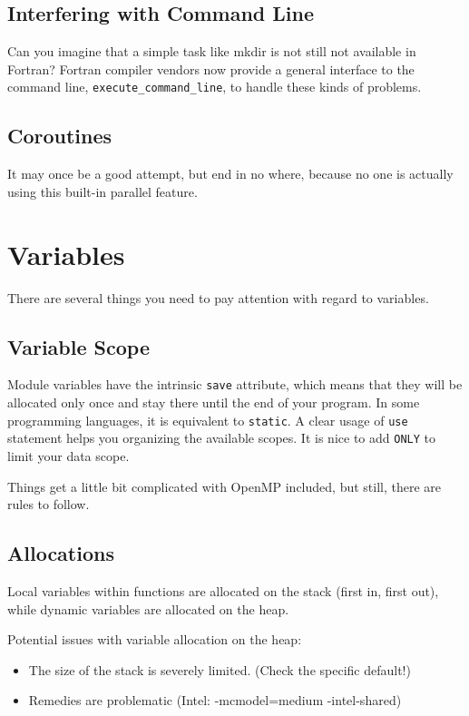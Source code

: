 \documentclass[11pt]{book} %
\begin{document}
\subsection{Interfering with Command Line}

Can you imagine that a simple task like mkdir is not still not available in Fortran? Fortran compiler vendors now provide a general interface to the command line, \verb|execute_command_line|, to handle these kinds of problems.

\subsection{Coroutines}

It may once be a good attempt, but end in no where, because no one is actually using this built-in parallel feature.

\section{Variables}

There are several things you need to pay attention with regard to variables.

\subsection{Variable Scope}

Module variables have the intrinsic \verb|save| attribute, which means that they will be allocated only once and stay there until the end of your program. In some programming languages, it is equivalent to \verb|static|. A clear usage of \verb|use| statement helps you organizing the available scopes. It is nice to add \verb|ONLY| to limit your data scope.

Things get a little bit complicated with OpenMP included, but still, there are rules to follow.


\subsection{Allocations}

Local variables within functions are allocated on the stack (first in, first out), while dynamic variables are allocated on the heap.

Potential issues with variable allocation on the heap:
\begin{itemize}
\item The size of the stack is severely limited. (Check the specific default!)
\item Remedies are problematic (Intel: -mcmodel=medium -intel-shared)
\end{itemize}
\end{document}
